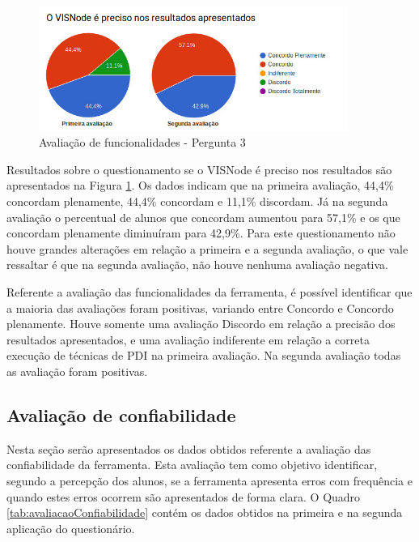 \documentclass[
	12pt,				%
	oneside,			%
	a4paper,			%
	english,			%
	french,				%
	spanish,			%
	brazil,				%
	]{abntex2}
\begin{document}
\begin{figure}[H]
\centering
\caption{Avaliação de funcionalidades - Pergunta 3}\label{fig:avaliacaoFuncionalidades3}
\includegraphics[width=0.9\textwidth]{imagens/avaliacoes/avaliacao_funcionalidade_3.jpg}
\sourceAuthor
\end{figure}

Resultados sobre o questionamento se o VISNode é preciso nos resultados são apresentados na Figura \ref{fig:avaliacaoFuncionalidades3}. Os dados indicam que na primeira avaliação, 44,4\% concordam plenamente, 44,4\% concordam e 11,1\% discordam. Já na segunda avaliação o percentual de alunos que concordam aumentou para 57,1\% e os que concordam plenamente diminuíram para 42,9\%. Para este questionamento não houve grandes alterações em relação a primeira e a segunda avaliação, o que vale ressaltar é que na segunda avaliação, não houve nenhuma avaliação negativa.

Referente a avaliação das funcionalidades da ferramenta, é possível identificar que a maioria das avaliações foram positivas, variando entre Concordo e Concordo plenamente. Houve somente uma avaliação Discordo em relação a precisão dos resultados apresentados, e uma avaliação indiferente em relação a correta execução de técnicas de PDI na primeira avaliação. Na segunda avaliação todas as avaliação foram positivas.

\subsection{Avaliação de confiabilidade}

Nesta seção serão apresentados os dados obtidos referente a avaliação das confiabilidade da ferramenta. Esta avaliação tem como objetivo identificar, segundo a percepção dos alunos, se a ferramenta apresenta erros com frequência e quando estes erros ocorrem são apresentados de forma clara. O Quadro \ref{tab:avaliacaoConfiabilidade} contém os dados obtidos na primeira e na segunda aplicação do questionário. 
\end{document}
